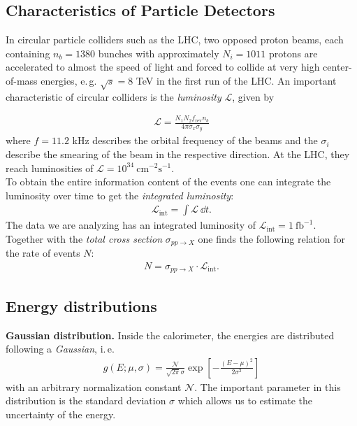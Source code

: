 \documentclass[twocolumn,
			   showpacs,%
               nofootinbib,
               aps,%
               prd,
               notitlepage,
               showkeys,
               10pt]{revtex4-1}
\begin{document}
\subsection{Characteristics of Particle Detectors}
In circular particle colliders such as the LHC, two opposed proton beams, each containing $n_b = 1380$ bunches with approximately $N_i = 1011$ protons are accelerated to almost the speed of light and forced to collide at very high center-of-mass energies, e.\,g. $\sqrt{s} = 8$ TeV in the first run of the LHC. An important characteristic of circular colliders is the \textit{luminosity} $\mathcal{L}$, given by

\begin{align}
\mathcal{L} = \frac{N_1N_2f_{\text{rev}}n_b}{4\pi\sigma_x\sigma_y}
\end{align}
where $f = 11.2$ kHz describes the orbital frequency of the beams and the $\sigma_i$ describe the smearing of the beam in the respective direction. At the LHC, they reach luminosities of $\mathcal{L}=10^{34} \ \mathrm{cm}^{-2} \mathrm{s}^{-1}$.\\
To obtain the entire information content of the events one can integrate the luminosity over time to get the \textit{integrated luminosity}:
\begin{align}
\mathcal{L}_{\text{int}} = \int \mathcal{L} \ \dd t.
\end{align}
The data we are analyzing has an integrated luminosity of $\mathcal{L}_{\mathrm{int}}=1 \ \mathrm{fb}^{-1}$.\\
Together with the \textit{total cross section} $\sigma_{pp\rightarrow X}$ one finds the following relation for the rate of events $N$: 
\begin{align}
N = \sigma_{pp\rightarrow X} \cdot \mathcal{L}_{\text{int}}.
\end{align}

\subsection{Energy distributions}
\textbf{Gaussian distribution.} Inside the calorimeter, the energies are distributed following a \textit{Gaussian}, i.\,e. 
\begin{align}
g(E ; \mu, \sigma)=\frac{\mathcal{N}}{\sqrt{2 \pi} \sigma} \exp \left[-\frac{(E-\mu)^{2}}{2 \sigma^{2}}\right]
\label{eqn:Gaussian}
\end{align}
with an arbitrary normalization constant $\mathcal{N}$. The important parameter in this distribution is the standard deviation $\sigma$ which allows us to estimate the uncertainty of the energy.\\
\end{document}
